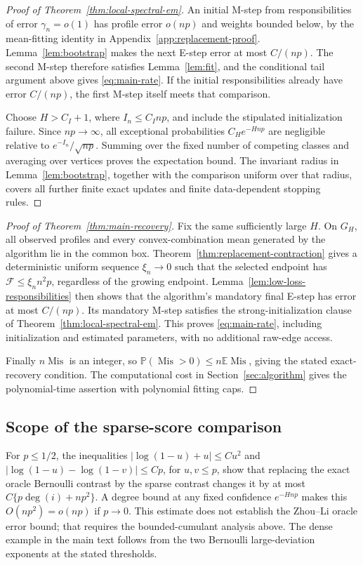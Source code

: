 \documentclass[11pt]{article}
\theoremstyle{definition}
\theoremstyle{remark}
\newcommand{\Mis}{\operatorname{Mis}}
\newcommand{\E}{\mathbb E}
\newcommand{\PP}{\mathbb P}
\numberwithin{equation}{section}
\begin{document}
\begin{proof}[Proof of Theorem~\ref{thm:local-spectral-em}]
An initial M-step from responsibilities of error $\gamma_n=o(1)$ has profile error $o(np)$ and weights bounded below, by the mean-fitting identity in Appendix~\ref{app:replacement-proof}. Lemma~\ref{lem:bootstrap} makes the next E-step error at most $C/(np)$. The second M-step therefore satisfies Lemma~\ref{lem:fit}, and the conditional tail argument above gives \eqref{eq:main-rate}. If the initial responsibilities already have error $C/(np)$, the first M-step itself meets that comparison.

Choose $H>C_I+1$, where $I_n\le C_I np$, and include the stipulated initialization failure. Since $np\to\infty$, all exceptional probabilities $C_H e^{-Hnp}$ are negligible relative to $e^{-I_n}/\sqrt{np}$. Summing over the fixed number of competing classes and averaging over vertices proves the expectation bound. The invariant radius in Lemma~\ref{lem:bootstrap}, together with the comparison uniform over that radius, covers all further finite exact updates and finite data-dependent stopping rules.
\end{proof}

\begin{proof}[Proof of Theorem~\ref{thm:main-recovery}]
Fix the same sufficiently large $H$. On $G_H$, all observed profiles and every convex-combination mean generated by the algorithm lie in the common box. Theorem~\ref{thm:replacement-contraction} gives a deterministic uniform sequence $\xi_n\to0$ such that the selected endpoint has $\mathcal F\le\xi_n n^2p$, regardless of the growing endpoint. Lemma~\ref{lem:low-loss-responsibilities} then shows that the algorithm's mandatory final E-step has error at most $C/(np)$. Its mandatory M-step satisfies the strong-initialization clause of Theorem~\ref{thm:local-spectral-em}. This proves \eqref{eq:main-rate}, including initialization and estimated parameters, with no additional raw-edge access.

Finally $n\Mis$ is an integer, so $\PP(\Mis>0)\le n\E\Mis$, giving the stated exact-recovery condition. The computational cost in Section~\ref{sec:algorithm} gives the polynomial-time assertion with polynomial fitting caps.
\end{proof}

\subsection{Scope of the sparse-score comparison}
For $p\le1/2$, the inequalities
$|\log(1-u)+u|\le Cu^2$ and
$|\log(1-u)-\log(1-v)|\le Cp$, for $u,v\le p$, show that replacing the exact oracle Bernoulli contrast by the sparse contrast changes it by at most
$C\{p\deg(i)+np^2\}$. A degree bound at any fixed confidence $e^{-Hnp}$ makes this $O(np^2)=o(np)$ if $p\to0$. This estimate does not establish the Zhou--Li oracle error bound; that requires the bounded-cumulant analysis above. The dense example in the main text follows from the two Bernoulli large-deviation exponents at the stated thresholds.
\end{document}
